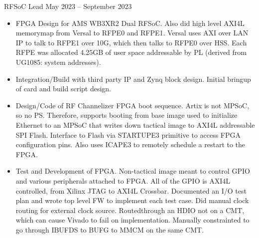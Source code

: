 \documentclass[10pt,final,sans]{resume}
\begin{document}
 { RFSoC Lead } { May 2023 -- September 2023 }
\begin{itemize}
  \item FPGA Design for AMS WB3XR2 Dual RFSoC. Also did high level AXI4L memorymap from Versal to RFPE0 and RFPE1. Versal uses AXI over LAN IP to talk to RFPE1 over 10G, which then talks to RFPE0 over HSS. Each RFPE was allocated 4.25GB of user space addressable by PL (derived from UG1085: system addresses).
  \item Integration/Build with third party IP and Zynq block design. Initial bringup of card and build script design.
  \item Design/Code of RF Channelizer FPGA boot sequence. Artix is not MPSoC, so no PS. Therefore, supports booting from base image used to initialize Ethernet to an MPSoC that writes down tactical image to AXI4L addressable SPI Flash. Interface to Flash via STARTUPE3 primitive to access FPGA configuration pins. Also uses ICAPE3 to remotely schedule a restart to the FPGA. 
  \item Test and Development of FPGA. Non-tactical image meant to control GPIO and various peripherals attached to FPGA. All of the GPIO is AXI4L controlled, from Xilinx JTAG to AXI4L Crossbar. Documented an I/O test plan and wrote top level FW to implement each test case. Did manual clock routing for external clock source. Routedthrough an HDIO not on a CMT, which can cause Vivado to fail on implementation. Manually constrainted to go through IBUFDS to BUFG to MMCM on the same CMT.
\end{itemize}
\end{document}
